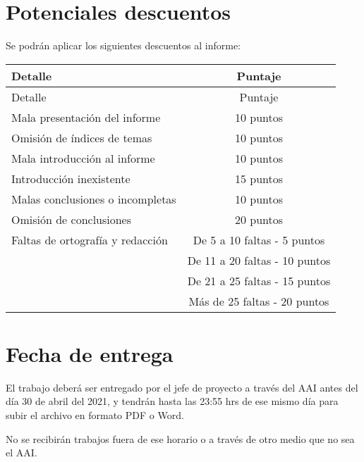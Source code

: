 \documentclass[]{article}
\begin{document}
\section{Potenciales descuentos}

Se podrán aplicar los siguientes descuentos al informe:

\begin{longtable}[c]{|l|c|}
    \hline
    Detalle & Puntaje \\
    \hline
    \endfirsthead

    \hline
    Detalle & Puntaje \\
    \hline
    \endhead

    Mala presentación del informe & 10 puntos \\
    \hline
    Omisión de índices de temas & 10 puntos \\
    \hline
    Mala introducción al informe & 10 puntos \\
    \hline
    Introducción inexistente & 15 puntos \\
    \hline
    Malas conclusiones o incompletas & 10 puntos \\
    \hline
    Omisión de conclusiones & 20 puntos \\
    \hline
    Faltas de ortografía y redacción & De 5 a 10 faltas - 5 puntos \\
    & De 11 a 20 faltas - 10 puntos \\
    & De 21 a 25 faltas - 15 puntos \\
    & Más de 25 faltas - 20 puntos \\
    \hline
\end{longtable}

\section{Fecha de entrega}

El trabajo deberá ser entregado por el jefe de proyecto a través del AAI antes del día 30 de abril del 2021, y tendrán hasta las 23:55 hrs de ese mismo día para subir el archivo en formato PDF o Word.

No se recibirán trabajos fuera de ese horario o a través de otro medio que no sea el AAI.
\end{document}
